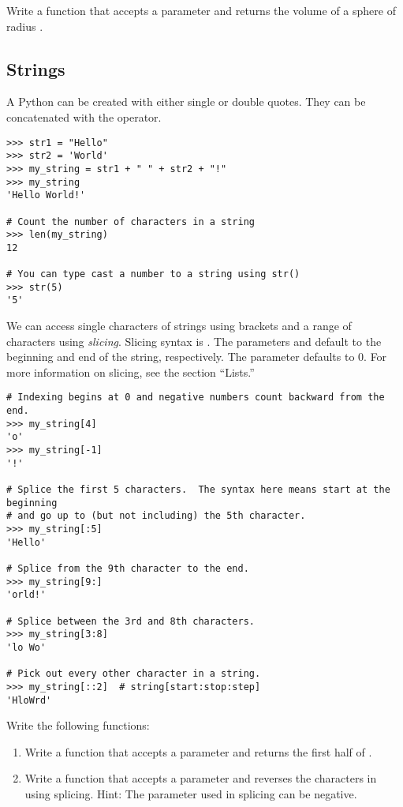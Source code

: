 \begin{problem}
Write a function  that accepts a parameter  and returns the volume of a sphere of radius .
\end{problem}


\subsection*{Strings}
A Python  can be created with either single or double quotes. They can be concatenated with the \li{+} operator.
\begin{lstlisting}
>>> str1 = "Hello"
>>> str2 = 'World'
>>> my_string = str1 + " " + str2 + "!"
>>> my_string
'Hello World!'

# Count the number of characters in a string
>>> len(my_string)
12

# You can type cast a number to a string using str()
>>> str(5)
'5'
\end{lstlisting}

We can access single characters of strings using brackets and a range of characters using \emph{slicing}. Slicing syntax is . The parameters  and  default to the beginning and end of the string, respectively. The parameter  defaults to 0. For more information on slicing, see the section ``Lists.''

\begin{lstlisting}
# Indexing begins at 0 and negative numbers count backward from the end.
>>> my_string[4]
'o'
>>> my_string[-1]
'!'

# Splice the first 5 characters.  The syntax here means start at the beginning
# and go up to (but not including) the 5th character.
>>> my_string[:5]
'Hello'

# Splice from the 9th character to the end.
>>> my_string[9:]
'orld!'

# Splice between the 3rd and 8th characters.
>>> my_string[3:8]
'lo Wo'

# Pick out every other character in a string.
>>> my_string[::2]	# string[start:stop:step]
'HloWrd'
\end{lstlisting}

\begin{problem}
Write the following functions:
\begin{enumerate}
\item Write a function  that accepts a parameter  and returns the first half of .
\item Write a function  that accepts a parameter  and reverses the characters in  using splicing.  Hint: The  parameter used in splicing can be negative.
\end{enumerate}
\end{problem}


